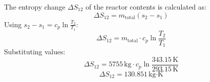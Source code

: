 The entropy change \( \Delta S_{12} \) of the reactor contents is calculated as:  
\[
\Delta S_{12} = m_{\text{total}} \left( s_2 - s_1 \right)
\]  
Using \( s_2 - s_1 = c_p \ln \frac{T_2}{T_1} \):  
\[
\Delta S_{12} = m_{\text{total}} \cdot c_p \ln \frac{T_2}{T_1}
\]  
Substituting values:  
\[
\Delta S_{12} = 5755 \, \text{kg} \cdot c_p \ln \frac{343.15 \, \text{K}}{293.15 \, \text{K}}
\]  
\[
\Delta S_{12} = 130.851 \, \text{kg·K}
\]